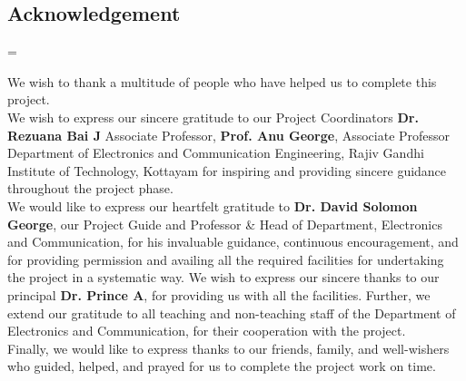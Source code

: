 \begin{center}

    \vspace{6pt}
    \vspace{20pt}

    \begin{minipage} {0.9\textwidth}

        \chapter*{Acknowledgement}


        \setlength{\parindent}{10pt}
        \setlength{\parskip}{10pt}

        \emergencystretch=\maxdimen

        \noindent We wish to thank a multitude of people who have helped us to
        complete this project.
        \\


        \noindent We wish to express our sincere gratitude to our Project
        Coordinators \textbf{Dr. Rezuana Bai J} Associate Professor,
        \textbf{Prof. Anu George}, Associate Professor Department of
        Electronics and Communication Engineering, Rajiv Gandhi Institute of
        Technology, Kottayam for inspiring and providing sincere guidance
        throughout the project phase.
        \\


        \noindent We would like to express our heartfelt gratitude to
        \textbf{Dr. David Solomon George}, our Project Guide and Professor \&
        Head of Department, Electronics and Communication, for his invaluable
        guidance, continuous encouragement, and for providing permission and
        availing all the required facilities for undertaking the project in a
        systematic way. We wish to express our sincere thanks to our principal
        \textbf{Dr. Prince A}, for providing us with all the facilities.
        Further, we extend our gratitude to all teaching and non-teaching staff
        of the Department of Electronics and Communication, for their
        cooperation with the project.
        \\


        \noindent Finally, we would like to express thanks to our friends,
        family, and well-wishers who guided, helped, and prayed for us to
        complete the project work on time.


\end{minipage}
\end{center}
